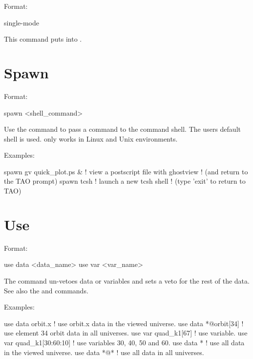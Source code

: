 {{{Format:
\begin{example}
  single-mode
\end{example}

\vskip 0.2in 
This command puts \tao into . 

\section{Spawn}
\label{s:spawn}

Format:
\begin{example}
  spawn <shell_command>
\end{example}

\vskip 0.2in
Use the  command to pass a command to the command shell.  The users
default shell is used.  only works in Linux and Unix environments.

Examples:
\begin{example}
  spawn gv quick_plot.ps &      ! view a postscript file with ghostview
                                ! (and return to the TAO prompt)
  spawn tcsh                    ! launch a new tcsh shell 
                                ! (type 'exit' to return to TAO)
\end{example}

\section{Use}
\label{s:use}

Format:
\begin{example}
  use data  <data_name>
  use var <var_name>
\end{example}

\vskip 0.2in 
The  command un-vetoes data or variables and sets a veto for
the rest of the data. See also the  and 
commands.

Examples:
\begin{example}
  use data orbit.x             ! use orbit.x data in the viewed universe.
  use data *@orbit[34]         ! use element 34 orbit data in all universes.
  use var quad_k1[67]          ! use variable.
  use var quad_k1[30:60:10]    ! use variables 30, 40, 50 and 60.
  use data *                   ! use all data in the viewed universe.
  use data *@*                 ! use all data in all universes.
\end{example}


}}}

